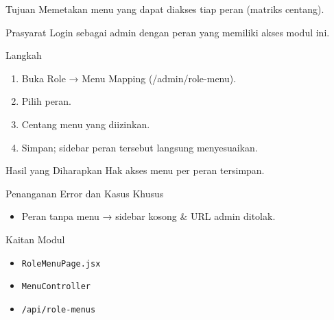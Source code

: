 
\begin{flowsection}{Tujuan}
Memetakan menu yang dapat diakses tiap peran (matriks centang).
\end{flowsection}

\begin{flowsection}{Prasyarat}
Login sebagai admin dengan peran yang memiliki akses modul ini.
\end{flowsection}

\begin{flowsection}{Langkah}
\begin{enumerate}
  \item Buka Role → Menu Mapping (/admin/role-menu).
  \item Pilih peran.
  \item Centang menu yang diizinkan.
  \item Simpan; sidebar peran tersebut langsung menyesuaikan.
\end{enumerate}
\end{flowsection}


\begin{flowsection}{Hasil yang Diharapkan}
Hak akses menu per peran tersimpan.
\end{flowsection}

\begin{flowsection}{Penanganan Error dan Kasus Khusus}
\begin{itemize}
  \item Peran tanpa menu → sidebar kosong \&  URL admin ditolak.
\end{itemize}
\end{flowsection}

\begin{flowsection}{Kaitan Modul}
\begin{itemize}
  \item \texttt{RoleMenuPage.jsx}
  \item \texttt{MenuController}
  \item \texttt{/api/role-menus}
\end{itemize}
\end{flowsection}

